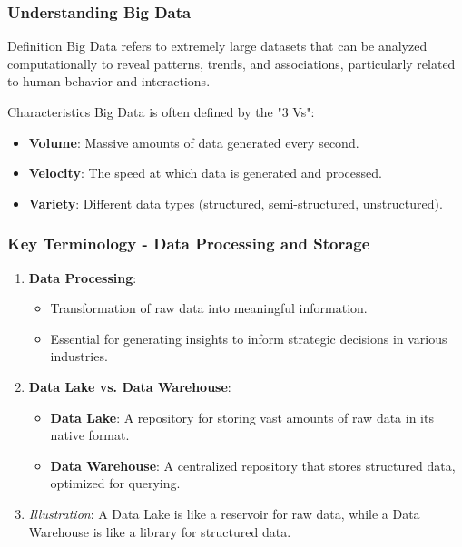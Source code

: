 \documentclass[aspectratio=169]{beamer}
\begin{document}
\begin{frame}[fragile]
    \frametitle{Understanding Big Data}
    \begin{block}{Definition}
        Big Data refers to extremely large datasets that can be analyzed computationally to reveal patterns, trends, and associations, particularly related to human behavior and interactions.
    \end{block}
    \begin{block}{Characteristics}
        Big Data is often defined by the "3 Vs":
        \begin{itemize}
            \item \textbf{Volume}: Massive amounts of data generated every second.
            \item \textbf{Velocity}: The speed at which data is generated and processed.
            \item \textbf{Variety}: Different data types (structured, semi-structured, unstructured).
        \end{itemize}
    \end{block}
\end{frame}

\begin{frame}[fragile]
    \frametitle{Key Terminology - Data Processing and Storage}
    \begin{enumerate}
        \item \textbf{Data Processing}:
            \begin{itemize}
                \item Transformation of raw data into meaningful information.
                \item Essential for generating insights to inform strategic decisions in various industries.
            \end{itemize}
        \item \textbf{Data Lake vs. Data Warehouse}:
            \begin{itemize}
                \item \textbf{Data Lake}: 
                    A repository for storing vast amounts of raw data in its native format.
                \item \textbf{Data Warehouse}: 
                    A centralized repository that stores structured data, optimized for querying.
            \end{itemize}
            \item \textit{Illustration}: A Data Lake is like a reservoir for raw data, while a Data Warehouse is like a library for structured data.
    \end{enumerate}
\end{frame}
\end{document}
